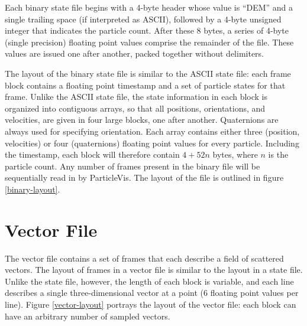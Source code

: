 Each binary state file begins with a 4-byte header whose value is ``DEM'' and a single trailing space (if interpreted as ASCII),
followed by a 4-byte unsigned integer that indicates the particle count.
After these 8 bytes, a series of 4-byte (single precision) floating point values comprise the remainder of the file.
These values are issued one after another, packed together without delimiters.

The layout of the binary state file is similar to the ASCII state file: each frame block contains a floating point timestamp and a set of particle states for that frame.
Unlike the ASCII state file, the state information in each block is organized into contiguous arrays, so that all positions, orientations, and velocities, are given
in four large blocks, one after another.
Quaternions are always used for specifying orientation.
Each array contains either three (position, velocities) or four (quaternions) floating point values for every particle.
Including the timestamp, each block will therefore contain $4 + 52n$ bytes, where $n$ is the particle count.
Any number of frames present in the binary file will be sequentially read in by ParticleVis.  The layout of the file is outlined in figure \ref{binary-layout}.

\section{Vector File}

The vector file contains a set of frames that each describe a field of scattered vectors.  The layout of frames in a vector file is similar to the layout in a state file.  Unlike the state file, however, the length of each block is variable, and each line describes a single three-dimensional vector at a point (6 floating point values per line).  Figure \ref{vector-layout} portrays the layout of the vector file: each block can have an arbitrary number of sampled vectors.

